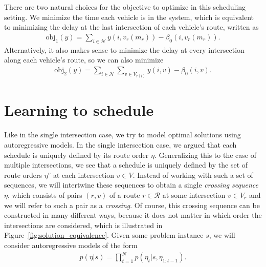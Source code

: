 \documentclass[a4paper]{article}
\theoremstyle{definition}
\theoremstyle{plain}
\begin{document}
There are two natural choices for the objective to optimize in this scheduling
setting.
%
We minimize the time each vehicle is in the system, which is equivalent to
minimizing the delay at the last intersection of each vehicle's route, written as
\begin{align*}
  \text{obj}_{1}(y) = \sum_{i \in \mathcal{N}} y(i, v_{r}(m_{r})) - \beta_{0}(i, v_{r}(m_{r})) .
\end{align*}
Alternatively, it also makes sense to minimize the delay at every
intersection along each vehicle's route, so we can also minimize
\begin{align*}
  \text{obj}_{2}(y) = \sum_{i \in \mathcal{N}} \sum_{v \in V_{r(i)}} y(i, v) - \beta_{0}(i, v) .
\end{align*}



\newpage
\section{Learning to schedule}

Like in the single intersection case, we try to model optimal solutions using
autoregressive models.
%
In the single intersection case, we argued that each schedule is uniquely
defined by its route order $\eta$. Generalizing this to the case of multiple
intersections, we see that a schedule is uniquely defined by the set of route
orders $\eta^{v}$ at each intersection $v \in V$. Instead of working with such a set
of sequences, we will intertwine these sequences to obtain a single \textit{crossing sequence}
$\eta$, which consists of pairs $(r, v)$ of a route $r \in \mathcal{R}$ at some
intersection $v \in V_{r}$ and we will refer to such a pair as a \textit{crossing}. Of
course, this crossing sequence can be constructed in many different ways,
because it does not matter in which order the intersections are considered,
which is illustrated in Figure~\ref{fig:solution_equivalence}.
Given some problem instance $s$, we will consider autoregressive models of the form
\begin{align}
  \label{eq:autoregressive}
  p(\eta | s) =  \prod_{t=1}^{N} p(\eta_{t}| s, \eta_{1:t-1}) .
\end{align}
\end{document}
